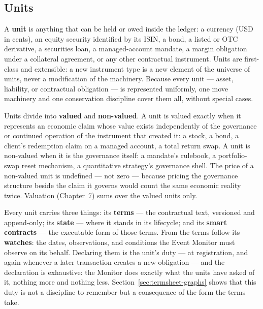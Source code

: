 \documentclass[11pt,a4paper]{article}
\begin{document}
\subsection{Units}

A \textbf{unit} is anything that can be held or owed inside the ledger: a currency (USD
in cents), an equity security identified by its ISIN, a bond, a listed or OTC derivative,
a securities loan, a managed-account mandate, a margin obligation under a collateral
agreement, or any other contractual instrument. Units are first-class and extensible: a
new instrument type is a new element of the universe of units, never a modification of
the machinery. Because every unit --- asset, liability, or contractual obligation --- is
represented uniformly, one move machinery and one conservation discipline cover them all,
without special cases.

Units divide into \textbf{valued} and \textbf{non-valued}. A unit is valued exactly when
it represents an economic claim whose value exists independently of the governance or
continued operation of the instrument that created it: a stock, a bond, a client's
redemption claim on a managed account, a total return swap. A unit is non-valued when it
is the governance itself: a mandate's rulebook, a portfolio-swap reset mechanism, a
quantitative strategy's governance shell. The price of a non-valued unit is undefined ---
not zero --- because pricing the governance structure beside the claim it governs would
count the same economic reality twice. Valuation (Chapter~7) sums over the valued units
only.

Every unit carries three things: its \textbf{terms} --- the contractual text, versioned
and append-only; its \textbf{state} --- where it stands in its lifecycle; and its
\textbf{smart contracts} --- the executable form of those terms. From the terms follow
its \textbf{watches}: the dates, observations, and conditions the Event Monitor must
observe on its behalf. Declaring them is the unit's duty --- at registration, and again
whenever a later transaction creates a new obligation --- and the declaration is
exhaustive: the Monitor does exactly what the units have asked of it, nothing more and
nothing less. Section~\ref{sec:termsheet-graphs} shows that this duty is not a discipline
to remember but a consequence of the form the terms take.
\end{document}

